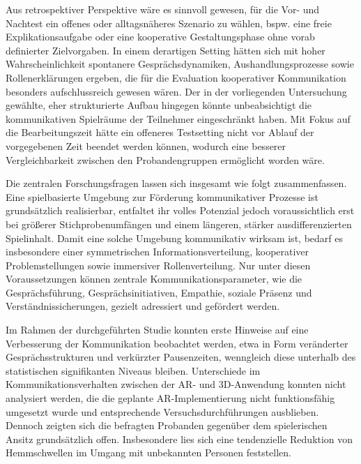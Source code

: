 Aus retrospektiver Perspektive wäre es sinnvoll gewesen, für die Vor- und Nachtest ein offenes oder alltagsnäheres Szenario zu wählen, bspw. eine freie Explikationsaufgabe oder eine kooperative Gestaltungsphase ohne vorab definierter Zielvorgaben. In einem derartigen Setting hätten sich mit hoher Wahrscheinlichkeit spontanere Gesprächsdynamiken, Aushandlungsprozesse sowie Rollenerklärungen ergeben, die für die Evaluation kooperativer Kommunikation besonders aufschlussreich gewesen wären. Der in der vorliegenden Untersuchung gewählte, eher strukturierte Aufbau hingegen könnte unbeabsichtigt die kommunikativen Spielräume der Teilnehmer eingeschränkt haben. Mit Fokus auf die Bearbeitungszeit hätte ein offeneres Testsetting nicht vor Ablauf der vorgegebenen Zeit beendet werden können, wodurch eine besserer Vergleichbarkeit zwischen den Probandengruppen ermöglicht worden wäre.

Die zentralen Forschungsfragen lassen sich insgesamt wie folgt zusammenfassen. Eine spielbasierte Umgebung zur Förderung kommunikativer Prozesse ist grundsätzlich realisierbar, entfaltet ihr volles Potenzial jedoch voraussichtlich erst bei größerer Stichprobenumfängen und einem längeren, stärker ausdifferenzierten Spielinhalt. Damit eine solche Umgebung kommunikativ wirksam ist, bedarf es insbesondere einer symmetrischen Informationsverteilung, kooperativer Problemstellungen sowie immersiver Rollenverteilung. Nur unter diesen Voraussetzungen können zentrale Kommunikationsparameter, wie die Gesprächsführung, Gesprächsinitiativen, Empathie, soziale Präsenz und Verständnissicherungen, gezielt adressiert und gefördert werden.

Im Rahmen der durchgeführten Studie konnten erste Hinweise auf eine Verbesserung der Kommunikation beobachtet werden, etwa in Form veränderter Gesprächsstrukturen und verkürzter Pausenzeiten, wenngleich diese unterhalb des statistischen signifikanten Niveaus bleiben. Unterschiede im Kommunikationsverhalten zwischen der \ac{AR}- und \ac{3D}-Anwendung konnten nicht analysiert werden, die die geplante \ac{AR}-Implementierung nicht funktionsfähig umgesetzt wurde und entsprechende Versuchsdurchführungen ausblieben. Dennoch zeigten sich die befragten Probanden gegenüber dem spielerischen Ansitz grundsätzlich offen. Insbesondere lies sich eine tendenzielle Reduktion von Hemmschwellen im Umgang mit unbekannten Personen feststellen.